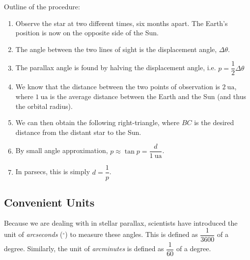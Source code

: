 \documentclass[a4paper,12pt]{article}
\newcommand{\degsym}{^{\circ}}
\begin{document}
Outline of the procedure:
\begin{enumerate}
  \item Observe the star at two different times, six months apart. The Earth's position is now on the opposite side of the Sun.
  \item The angle between the two lines of sight is the displacement angle, $\Delta \theta$.
  \item The parallax angle is found by halving the displacement angle, i.e. $p = \dfrac{1}{2}\Delta \theta$
  \item We know that the distance between the two points of observation is $\SI{2}{\astronomicalunit}$, where $\SI{1}{\astronomicalunit}$ is the average distance between the Earth and the Sun (and thus the orbital radius).
  \item We can then obtain the following right-triangle, where $BC$ is the desired distance from the distant star to the Sun.
        \begin{figure}[H]
          \centering
        \end{figure}
  \item By small angle approximation, $p \approx \tan p = \dfrac{d}{\SI{1}{\astronomicalunit}}$.
  \item In parsecs, this is simply $d = \dfrac{1}{p}$.
\end{enumerate}

\subsection{Convenient Units}

Because we are dealing with  in stellar parallax, scientists have introduced the unit of \textit{arcseconds} ($\degsym$) to measure these angles. This is defined as $\dfrac{1}{3600}$ of a degree. Similarly, the unit of \textit{arcminutes} is defined as $\dfrac{1}{60}$ of a degree.
\end{document}
